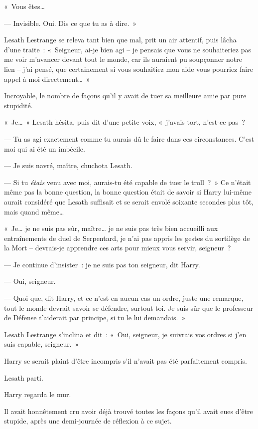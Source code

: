 «~Vous êtes…

--- Invisible.
Oui. Dis ce que tu as à dire.~»

Lesath Lestrange se releva tant bien que mal, prit un air attentif, puis lâcha d'une traite~: «~Seigneur, ai-je bien agi -- je pensais que vous ne souhaiteriez pas me voir m'avancer devant tout le monde, car ils auraient pu soupçonner notre lien -- j'ai pensé, que certainement si vous souhaitiez mon aide vous pourriez faire appel à moi directement…~»

Incroyable, le nombre de façons qu'il y avait de tuer sa meilleure amie par pure stupidité.

«~Je…~» Lesath hésita, puis dit d'une petite voix, «~j'avais tort, n'est-ce pas~?

--- Tu as agi exactement comme tu aurais dû le faire dans ces circonstances.
C'est moi qui ai été un imbécile.

--- Je suis navré, maître, chuchota Lesath.

--- Si tu \emph{étais} venu avec moi, aurais-tu été capable de tuer le troll~?~»
Ce n'était même pas la bonne question, la bonne question était de savoir si Harry lui-même aurait considéré que Lesath suffisait et se serait envolé soixante secondes plus tôt, mais quand même…

«~Je… je ne suis pas sûr, maître… je ne suis pas très bien accueilli aux entraînements de duel de Serpentard, je n'ai pas appris les gestes du sortilège de la Mort -- devrais-je apprendre ces arts pour mieux vous servir, seigneur~?

--- Je continue d'insister~: je ne suis pas ton seigneur, dit Harry.

--- Oui, seigneur.

--- Quoi que, dit Harry, et ce n'est en aucun cas un ordre, juste une remarque, tout le monde devrait savoir se défendre, surtout toi.
Je suis sûr que le professeur de Défense t'aiderait par principe, si tu le lui demandais.~»

Lesath Lestrange s'inclina et dit~: «~Oui, seigneur, je suivrais vos ordres si j'en suis capable, seigneur.~»

Harry se serait plaint d'être incompris s'il n'avait pas été parfaitement compris.

Lesath parti.

Harry regarda le mur.

Il avait honnêtement cru avoir déjà trouvé toutes les façons qu'il avait eues d'être stupide, après une demi-journée de réflexion à ce sujet.

